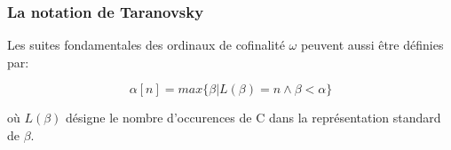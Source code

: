 \documentclass[12pt]{beamer}
\begin{document}
\begin{frame}
\frametitle{La notation de Taranovsky}

Les suites fondamentales des ordinaux de cofinalité $\omega$ peuvent aussi être définies par:

\[ \alpha[n] = max \lbrace \beta | L(\beta) = n \land \beta < \alpha \rbrace \]

où \( L(\beta) \) désigne le nombre d'occurences de C dans la représentation standard de $\beta$.

\end{frame}

\begin{comment}

\begin{frame}
\frametitle{La notation de Taranovsky}


\small

C(a,b) est le plus petit ordinal supérieur à b qui a le degré a.

Définition: Un degré pour un ensemble bien ordonné S est une relation binaire sur S vérifiant :

\footnotesize

\begin{itemize}
	\item Tout élément \( c \in S \) a le degré \( 0_S \) (le plus petit élément de S). \( 0_S \) n'a que le degré  \( 0_S \).
	\item Pour une limite limit a, c a le degré a si et seulement si il a tout degré inférieur à a.
	\item Pour un successeur a'=a+1, une des propositions suivantes est vérifiée :
	\begin{itemize}
		\item Un élément a le degré a' si et seulement si c'est une limite d'éléments de degré a.
		\item Il existe un élément limite d \(\le\) a tel que pour tout c appartenant à S, c a le degré a' si et seulement si il a le degré a et soit c \(\le\) d soit c est une limite d'éléments de degré a (ou les deux). 
	\end{itemize}
\end{itemize}

\small

On a \( C(a,b) = b+\omega^a \) si et seulement si \( C(a,b) \ge a \).

\end{frame}
\begin{frame}

\footnotesize


\end{comment}
\end{document}
